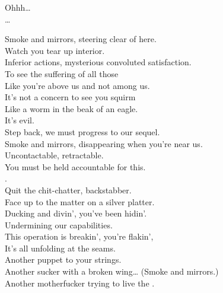 
\label{album:made-in-timeland}




Ohhh… \\
… \\





Smoke and mirrors, steering clear of here. \\
Watch you tear up interior. \\
Inferior actions, mysterious convoluted satisfaction. \\
To see the suffering of all those \\
Like you're above us and not among us. \\
It's not a concern to see you squirm \\
Like a worm in the beak of an eagle. \\
It's evil. \\
Step back, we must progress to our sequel. \\

Smoke and mirrors, disappearing when you're near us. \\
Uncontactable, retractable. \\
You must be held accountable for this. \\

. \\

Quit the chit-chatter, backstabber. \\
Face up to the matter on a silver platter. \\
Ducking and divin', you've been hidin'. \\
Undermining our capabilities. \\
This operation is breakin', you're flakin', \\
It's all unfolding at the seams. \\

Another puppet to your strings. \\
Another sucker with a broken wing… (Smoke and mirrors.) \\

Another motherfucker trying to live the . \\
